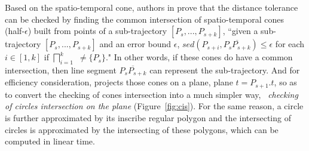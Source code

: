 Based on the spatio-temporal cone, authors in \cite{Lin:Cised} prove that the \sed distance tolerance can be checked by finding the common intersection of spatio-temporal cones  (half-$\epsilon$) built from points of a sub-trajectory $[P_s,...,P_{s+k}]$, \ie ``{given a sub-trajectory $[P_s,...,P_{s+k}]$ and an error bound $\epsilon$, $sed(P_{s+i}, \overline{P_sP_{s+k}})\le \epsilon$ for each $i \in [1,k]$ if  $\bigsqcap_{i=1}^{k}$ $\ne \{P_s\}$}."
In other words, if these cones do have a common intersection, then line segment $\overline{P_sP_{s+k}}$ can represent the sub-trajectory. And for efficiency consideration, \cised projects those cones on a plane, \eg plane $t=P_{s+1}.t$, so as to convert the checking of cones intersection into a much simpler way, \ie~\textit{checking of circles intersection on the plane} (Figure~\ref{fig:cis}).
For the same reason, a circle is further approximated by its inscribe regular polygon and the intersecting of circles is approximated by the intersecting of these polygons, which can be computed in linear time.
%





